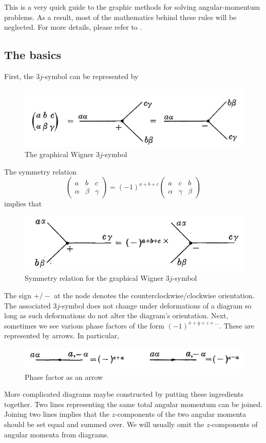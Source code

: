\documentclass[11pt]{article}
\newcommand{\al}{\alpha}
\newcommand{\be}{\beta}
\newcommand{\tj}[6]{ \begin{pmatrix}
		#1 & #2 & #3 \\
		#4 & #5 & #6 
\end{pmatrix}}
\begin{document}
This is a very quick guide to the graphic methods for solving angular-momentum problems. As a result, most of the mathematics behind these rules will be neglected. For more details, please refer to \cite{angular_momentum}.

\subsection{The basics}
First, the $3j$-symbol can be represented by 
\begin{figure}[!htb]
	\centering
	\includegraphics[scale=0.7]{j3_graph}
	\caption{The graphical Wigner $3j$-symbol \cite{angular_momentum}}
\end{figure}
The symmetry relation 
\begin{equation*}
\tj{a}{b}{c}{\al}{\be}{\gamma} = (-1)^{a+b+c}\tj{a}{c}{b}{\al}{\gamma}{\be}
\end{equation*}
implies that 
\begin{figure}[!htb]
	\centering
	\includegraphics[scale=0.7]{j3_graph1}
	\caption{Symmetry relation for the graphical Wigner $3j$-symbol \cite{angular_momentum}}
\end{figure}
The sign $+/-$ at the node denotes the counterclockwise/clockwise orientation. The associated $3j$-symbol does not change under deformations of a diagram so long as such deformations do not alter the diagram's orientation. Next, sometimes we see various phase factors of the form $(-1)^{x+y+z+\dots}$. These are represented by arrows. In particular, 
\begin{figure}[!htb]
	\centering
	\includegraphics[scale=0.7]{j3_graph2}
	\caption{Phase factor as an arrow \cite{angular_momentum}}
\end{figure}
More complicated diagrams maybe constructed by putting these ingredients together. Two lines representing the same total angular momentum can be joined. Joining two lines implies that the $z$-components of the two angular momenta should be set equal and summed over. We will usually omit the $z$-components of angular momenta from diagrams. 
\end{document}

